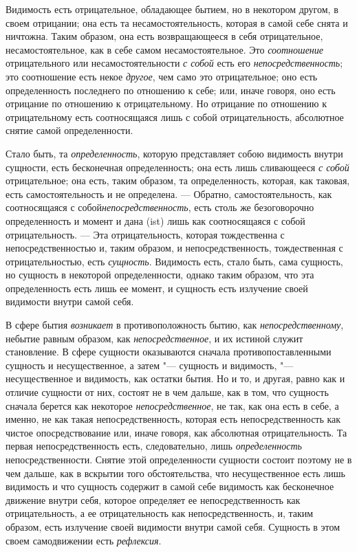Видимость есть отрицательное, обладающее бытием, но в некотором другом, в
своем отрицании; она есть та несамостоятельность, которая в самой себе
снята и ничтожна. Таким образом, она есть возвращающееся в себя
отрицательное, несамостоятельное, как в себе самом несамостоятельное. Это
{\em соотношение} отрицательного или
несамостоятельности {\em с собой} есть его
{\em непосредственность}; это соотношение есть некое
{\em другое}, чем само это отрицательное; оно есть
определенность последнего по отношению к себе; или, иначе говоря, оно есть
отрицание по отношению к отрицательному. Но отрицание по отношению к
отрицательному есть соотносящаяся лишь с собой отрицательность, абсолютное
снятие самой определенности.

Стало быть, та {\em определенность}, которую
представляет собою видимость внутри сущности, есть бесконечная
определенность; она есть лишь сливающееся {\em с собой}
отрицательное; она есть, таким образом, та определенность, которая, как
таковая, есть самостоятельность и не определена. --- Обратно,
самостоятельность, как соотносящаяся с собой{\em непосредственность},
есть столь же безоговорочно определенность и момент и
дана (ist) лишь как соотносящаяся с собой отрицательность. --- Эта
отрицательность, которая тождественна с непосредственностью и, таким
образом, и непосредственность, тождественная с отрицательностью, есть
{\em сущность}. Видимость есть, стало быть, сама
сущность, но сущность в некоторой определенности, однако таким образом, что
эта определенность есть лишь ее момент, и сущность есть излучение своей
видимости внутри самой себя.

В сфере бытия {\em возникает} в противоположность бытию,
как {\em непосредственному}, небытие равным образом,
как {\em непосредственное}, и их истиной служит становление. В сфере
сущности оказываются сначала противопоставленными сущность и несущественное,
а затем "--- сущность и видимость, "--- несущественное
и видимость, как остатки бытия. Но и то, и другая, равно как и отличие
сущности от них, состоят не в чем дальше, как в том, что сущность сначала
берется как некоторое {\em непосредственное}, не так,
как она есть в себе, а именно, не как такая непосредственность, которая
есть непосредственность как чистое опосредствование или, иначе говоря, как
абсолютная отрицательность. Та первая непосредственность есть,
следовательно, лишь {\em определенность}
непосредственности. Снятие этой определенности сущности состоит поэтому не
в чем дальше, как в вскрытии того обстоятельства, что несущественное есть
лишь видимость и что сущность содержит в самой себе видимость как
бесконечное движение внутри себя, которое определяет ее непосредственность
как отрицательность, а ее отрицательность как непосредственность, и, таким
образом, есть излучение своей видимости внутри самой себя. Сущность в этом
своем самодвижении есть {\em рефлексия}.

